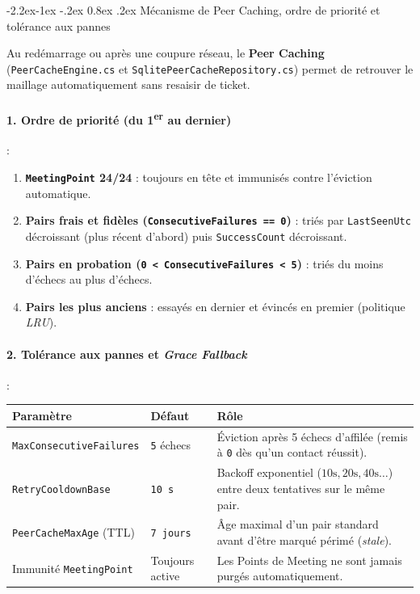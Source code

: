 \documentclass[11pt,a4paper]{article}
\makeatletter
\renewcommand\subsubsection{\@startsection{subsubsection}{3}{\z@}%
                                     {-2.2ex\@plus -1ex \@minus -.2ex}%
                                     {0.8ex \@plus .2ex}%
                                     {\normalfont\normalsize\bfseries\color{AccentTeal}}}
\makeatother
\begin{document}
\subsubsection{Mécanisme de Peer Caching, ordre de priorité et tolérance aux pannes}

Au redémarrage ou après une coupure réseau, le \textbf{Peer Caching} (\texttt{PeerCacheEngine.cs} et \texttt{SqlitePeerCacheRepository.cs}) permet de retrouver le maillage automatiquement sans resaisir de ticket.

\paragraph{1. Ordre de priorité (du 1\textsuperscript{er} au dernier)} :
\begin{enumerate}
    \item \textbf{\texttt{MeetingPoint} 24/24} : toujours en tête et immunisés contre l'éviction automatique.
    \item \textbf{Pairs frais et fidèles (\texttt{ConsecutiveFailures == 0})} : triés par \texttt{LastSeenUtc} décroissant (plus récent d'abord) puis \texttt{SuccessCount} décroissant.
    \item \textbf{Pairs en probation (\texttt{0 < ConsecutiveFailures < 5})} : triés du moins d'échecs au plus d'échecs.
    \item \textbf{Pairs les plus anciens} : essayés en dernier et évincés en premier (politique \emph{LRU}).
\end{enumerate}

\paragraph{2. Tolérance aux pannes et \emph{Grace Fallback}} :
\begin{table}[h!]
\centering
\footnotesize
\begin{tabular}{@{}llp{7.6cm}@{}}
\toprule
\textbf{Paramètre} & \textbf{Défaut} & \textbf{Rôle} \\
\midrule
\texttt{MaxConsecutiveFailures} & \texttt{5} échecs & Éviction après 5 échecs d'affilée (remis à \texttt{0} dès qu'un contact réussit). \\
\texttt{RetryCooldownBase} & \texttt{10 s} & Backoff exponentiel ($10\text{s}, 20\text{s}, 40\text{s}\dots$) entre deux tentatives sur le même pair. \\
\texttt{PeerCacheMaxAge} (TTL) & \texttt{7 jours} & Âge maximal d'un pair standard avant d'être marqué périmé (\emph{stale}). \\
Immunité \texttt{MeetingPoint} & Toujours active & Les Points de Meeting ne sont jamais purgés automatiquement. \\
\bottomrule
\end{tabular}
\end{table}
\end{document}
